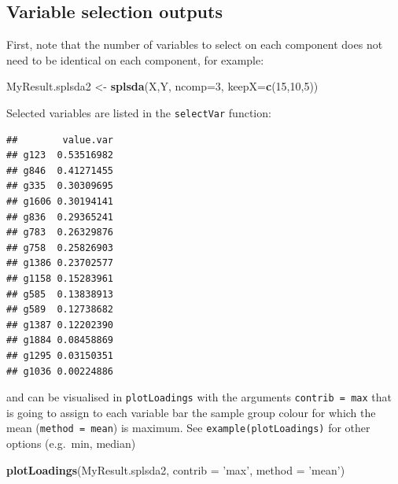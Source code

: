 \documentclass[]{book}
\newenvironment{Shaded}{\begin{snugshade}}{\end{snugshade}}
\newcommand{\DataTypeTok}[1]{\textcolor[rgb]{0.13,0.29,0.53}{#1}}
\newcommand{\DecValTok}[1]{\textcolor[rgb]{0.00,0.00,0.81}{#1}}
\newcommand{\KeywordTok}[1]{\textcolor[rgb]{0.13,0.29,0.53}{\textbf{#1}}}
\newcommand{\NormalTok}[1]{#1}
\newcommand{\OperatorTok}[1]{\textcolor[rgb]{0.81,0.36,0.00}{\textbf{#1}}}
\newcommand{\StringTok}[1]{\textcolor[rgb]{0.31,0.60,0.02}{#1}}
\begin{document}
\hypertarget{variable-selection-outputs}{%
\subsection{Variable selection outputs}\label{variable-selection-outputs}}

First, note that the number of variables to select on each component does not need to be identical on each component, for example:

\begin{Shaded}
\begin{Highlighting}[]
\NormalTok{MyResult.splsda2 <-}\StringTok{ }\KeywordTok{splsda}\NormalTok{(X,Y, }\DataTypeTok{ncomp=}\DecValTok{3}\NormalTok{, }\DataTypeTok{keepX=}\KeywordTok{c}\NormalTok{(}\DecValTok{15}\NormalTok{,}\DecValTok{10}\NormalTok{,}\DecValTok{5}\NormalTok{))}
\end{Highlighting}
\end{Shaded}

Selected variables are listed in the \texttt{selectVar} function:

\begin{Shaded}
\end{Shaded}

\begin{verbatim}
##        value.var
## g123  0.53516982
## g846  0.41271455
## g335  0.30309695
## g1606 0.30194141
## g836  0.29365241
## g783  0.26329876
## g758  0.25826903
## g1386 0.23702577
## g1158 0.15283961
## g585  0.13838913
## g589  0.12738682
## g1387 0.12202390
## g1884 0.08458869
## g1295 0.03150351
## g1036 0.00224886
\end{verbatim}

and can be visualised in \texttt{plotLoadings} with the arguments \texttt{contrib\ =\ \textquotesingle{}max\textquotesingle{}} that is going to assign to each variable bar the sample group colour for which the mean (\texttt{method\ =\ \textquotesingle{}mean\textquotesingle{}}) is maximum. See \texttt{example(plotLoadings)} for other options (e.g.~min, median)

\begin{Shaded}
\begin{Highlighting}[]
\KeywordTok{plotLoadings}\NormalTok{(MyResult.splsda2, }\DataTypeTok{contrib =} \StringTok{'max'}\NormalTok{, }\DataTypeTok{method =} \StringTok{'mean'}\NormalTok{)}
\end{Highlighting}
\end{Shaded}
\end{document}
